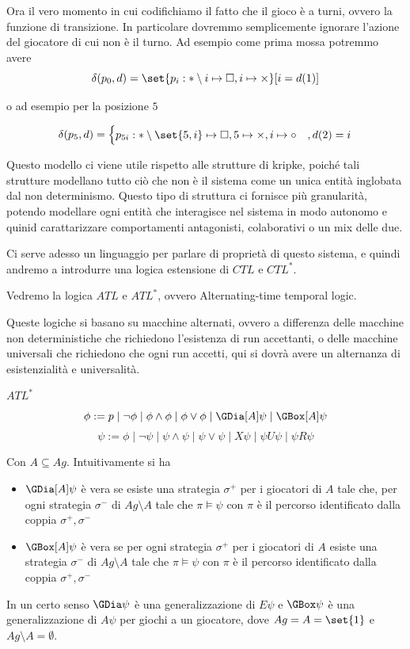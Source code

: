 Ora il vero momento in cui codifichiamo il fatto che il gioco è a turni, ovvero la funzione di transizione. In particolare dovremmo semplicemente ignorare l'azione del giocatore di cui non è il turno.
Ad esempio come prima mossa potremmo avere
\[\delta(p_0, d) = \set{p_i: *\setminus i \mapsto \square, i \mapsto \times}[ i = d(1)]\]

o ad esempio per la posizione \(5\)

\[\delta(p_5, d) = \begin{cases}
  p_{5i}: * \setminus \set{5,i} \mapsto \square, 5 \mapsto \times, i \mapsto \circ & ,d(2) = i \\
\end{cases}\]

Questo modello ci viene utile rispetto alle strutture di kripke, poiché tali strutture modellano tutto ciò che non è il sistema come un unica entità inglobata dal non determinismo. Questo tipo di struttura ci fornisce più granularità, potendo modellare ogni entità che interagisce nel sistema in modo autonomo e quinid carattarizzare comportamenti antagonisti, colaborativi o un mix delle due.

Ci serve adesso un linguaggio per parlare di proprietà di questo sistema, e quindi andremo a introdurre una logica estensione di \(CTL\) e \(CTL^*\).

Vedremo la logica \(ATL\) e \(ATL^*\), ovvero Alternating-time temporal logic.

Queste logiche si basano su macchine alternati, ovvero a differenza delle macchine non deterministiche che richiedono l'esistenza di run accettanti, o delle macchine universali che richiedono che ogni run accetti, qui si dovrà avere un alternanza di esistenzialità e universalità.

\begin{definition}{\(ATL^*\)}
  \[\phi := p \mid \neg \phi \mid \phi \land \phi \mid \phi \lor \phi \mid \GDia[A]\psi \mid \GBox[A] \psi\]
  \[\psi := \phi \mid \neg \psi \mid \psi \land \psi \mid \psi \lor \psi \mid X\psi \mid \psi U\psi \mid \psi R \psi\]

  Con \(A \subseteq Ag\). Intuitivamente si ha
  \begin{itemize}
    \item \(\GDia[A] \psi\) è vera se esiste una strategia \(\sigma^+\) per i giocatori di \(A\) tale che, per ogni strategia \(\sigma^-\) di \(Ag\setminus A\) tale che \(\pi\models \psi\) con \(\pi\) è il percorso identificato dalla coppia \(\sigma^+, \sigma^-\)
    \item \(\GBox[A] \psi\) è vera se per ogni strategia \(\sigma^+\) per i giocatori di \(A\) esiste una strategia \(\sigma^-\) di \(Ag\setminus A\) tale che \(\pi\models \psi\) con \(\pi\) è il percorso identificato dalla coppia \(\sigma^+, \sigma^-\)
  \end{itemize}

  In un certo senso \(\GDia \psi\) è una generalizzazione di \(E\psi\) e \(\GBox \psi\) è una generalizzazione di \(A\psi\) per giochi a un giocatore, dove \(Ag = A = \set{1}\) e \(Ag\setminus A = \emptyset\).
\end{definition}

